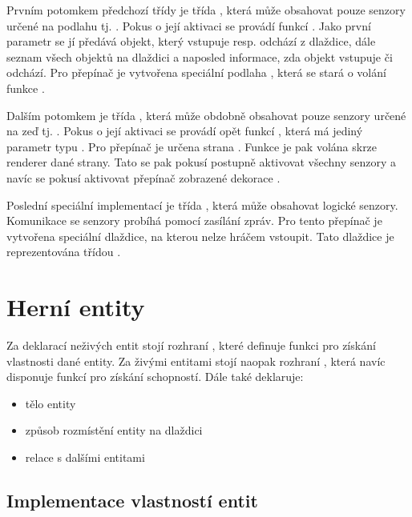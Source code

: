 Prvním potomkem předchozí třídy je třída , která může obsahovat pouze senzory určené
na podlahu tj. . Pokus o její aktivaci se provádí funkcí . Jako první parametr se jí předává objekt,
který vstupuje resp. odchází z dlaždice, dále seznam všech objektů na dlaždici a naposled informace, zda objekt
vstupuje či odchází. Pro přepínač je vytvořena speciální podlaha , která se stará 
o volání funkce .

Dalším potomkem je třída , která může obdobně obsahovat pouze senzory určené na zeď tj. .
Pokus o její aktivaci se provádí opět funkcí , která má jediný parametr typu . Pro přepínač
je určena strana . Funkce  je pak volána skrze renderer dané strany. 
Tato se pak pokusí postupně aktivovat všechny senzory a navíc se pokusí aktivovat přepínač zobrazené dekorace .


Poslední speciální implementací je třída , která může obsahovat logické senzory.
Komunikace se senzory probíhá pomocí zasílání zpráv. Pro tento přepínač je vytvořena speciální dlaždice,
na kterou nelze hráčem vstoupit. Tato dlaždice je reprezentována třídou . 


\section{Herní entity}

Za deklarací neživých entit stojí rozhraní , které definuje funkci  pro získání vlastnosti dané entity.
Za živými entitami stojí naopak rozhraní , která navíc disponuje funkcí  pro získání schopností. Dále
také deklaruje:

\begin{itemize}
\item tělo entity
\item způsob rozmístění entity na dlaždici
\item relace s dalšími entitami
\end{itemize}

\subsection{Implementace vlastností entit}


